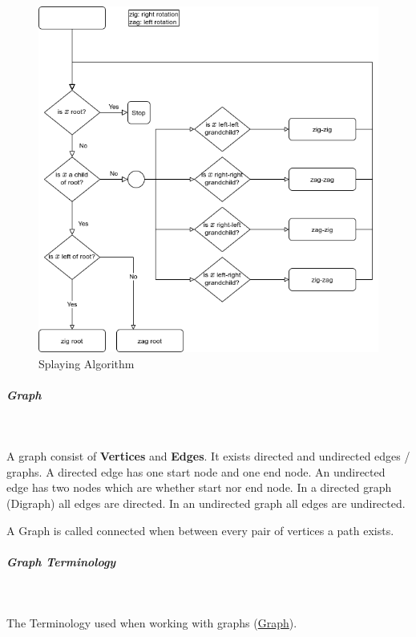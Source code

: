 \documentclass[11pt,twoside,twocolumn,landscape]{article}
\begin{document}
\begin{figure}[htbp]
\centering
\includegraphics[width=.9\linewidth]{img/splaying.png}
\caption{\label{fig:org873f917}Splaying Algorithm}
\end{figure}

\subparagraph{Graph} \
\label{sec:orge43ed9e}

A graph consist of \textbf{Vertices} and \textbf{Edges}.
It exists directed and undirected edges / graphs.
A directed edge has one start node and one end node.
An undirected edge has two nodes which are whether start nor end node.
In a directed graph (Digraph) all edges are directed.
In an undirected graph all edges are undirected.


A Graph is called connected when between every pair of vertices a path exists.

\subparagraph{Graph Terminology} \
\label{sec:org39eabb9}

The Terminology used when working with graphs (\href{../../../roam/20220201163000-graph.org}{Graph}).
\end{document}
